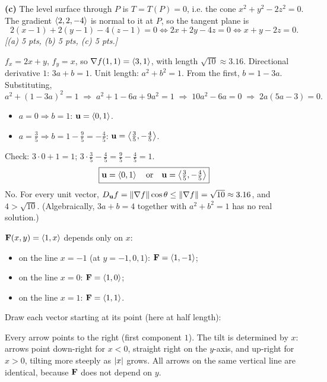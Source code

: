 \textbf{(c)} The level surface through $P$ is $T=T(P)=0$, i.e. the cone $x^2+y^2-2z^2=0$.
The gradient $\left\langle 2,2,-4 \right\rangle$ is normal to it at $P$, so the tangent plane is
\[
  2(x-1)+2(y-1)-4(z-1)=0\iff2x+2y-4z=0\iff\boxed{x+y-2z=0}.
\]
\textit{[(a) 5 pts, (b) 5 pts, (c) 5 pts.]}

 $f_x=2x+y$, $f_y=x$, so $\nabla f(1,1)=\left\langle 3,1 \right\rangle$, with length $\sqrt{10}\approx3.16$.
 Directional derivative $1$: $3a+b=1$. Unit length: $a^2+b^2=1$.
 From the first, $b=1-3a$. Substituting,
\[
  a^2+(1-3a)^2=1\;\Longrightarrow\;a^2+1-6a+9a^2=1\;\Longrightarrow\;10a^2-6a=0\;\Longrightarrow\;2a(5a-3)=0 .
\]
\begin{itemize}
\item $a=0\Rightarrow b=1$: $\mathbf{u}=\left\langle 0,1 \right\rangle$.
\item $a=\frac35\Rightarrow b=1-\frac95=-\frac45$: $\mathbf{u}=\left\langle \frac35,-\frac45 \right\rangle$.
\end{itemize}
Check: $3\cdot0+1=1$\checkok; $3\cdot\frac35-\frac45=\frac95-\frac45=1$\checkok.
\[
  \boxed{\mathbf{u}=\left\langle 0,1 \right\rangle\quad\text{or}\quad\mathbf{u}=\left\langle \tfrac35,-\tfrac45 \right\rangle}
\]
 No. For every unit vector,
$D_{\mathbf{u}} f=\lVert\nabla f\rVert\cos\theta\le\lVert\nabla f\rVert=\sqrt{10}\approx3.16$, and $4>\sqrt{10}$. (Algebraically,
$3a+b=4$ together with $a^2+b^2=1$ has no real solution.)

 $\mathbf{F}(x,y)=\left\langle 1,x \right\rangle$ depends only on $x$:
\begin{itemize}
\item on the line $x=-1$ (at $y=-1,0,1$): $\mathbf{F}=\left\langle 1,-1 \right\rangle$;
\item on the line $x=0$: $\mathbf{F}=\left\langle 1,0 \right\rangle$;
\item on the line $x=1$: $\mathbf{F}=\left\langle 1,1 \right\rangle$.
\end{itemize}
 Draw each vector starting at its point (here at half length):
\begin{center}
\end{center}
 Every arrow points to the right (first component $1$). The tilt is
determined by $x$: arrows point down-right for $x<0$, straight right on the $y$-axis,
and up-right for $x>0$, tilting more steeply as $\lvert x\rvert$ grows. All arrows on the same
vertical line are identical, because $\mathbf{F}$ does not depend on $y$.

